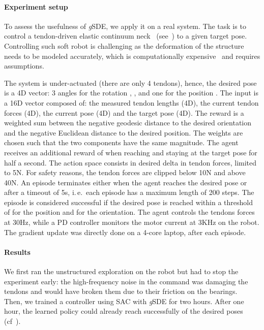 \documentclass{article}
\newcommand{\ie}{i.\,e.\ }
\newcommand{\ourSDE}{\textit{g}\textsc{SDE}\xspace}
\newcommand{\sac}{\textsc{SAC}\xspace}
\begin{document}
\paragraph{Experiment setup}

To assess the usefulness of \ourSDE, we apply it on a real system. The task is to control a tendon-driven elastic continuum neck~\citep{reinecke2016structurally} (see~) to a given target pose. Controlling such soft robot is challenging as the deformation of the structure needs to be modeled accurately, which is computationally expensive~\cite{deutschmann2017position, deutschmann2019six} and requires assumptions.

The system is under-actuated (there are only 4 tendons), hence, the desired pose is a 4D vector: 3 angles for the rotation , ,  and one for the position . The input is a 16D vector composed of: the measured tendon lengths (4D), the current tendon forces (4D), the current pose (4D) and the target pose (4D). The reward is a weighted sum between the negative geodesic distance to the desired orientation and the negative Euclidean distance to the desired position. The weights are chosen such that the two components have the same magnitude. The agent receives an additional reward of  when reaching and staying at the target pose for half a second.
The action space consists in desired delta in tendon forces, limited to 5N. For safety reasons, the tendon forces are clipped below 10N and above 40N.
An episode terminates either when the agent reaches the desired pose or after a timeout of 5s, \ie each episode has a maximum length of 200 steps. The episode is considered successful if the desired pose is reached within a threshold of  for the position and  for the orientation. The agent controls the tendons forces at 30Hz, while a PD controller monitors the motor current at 3KHz on the robot. The gradient update was directly done on a 4-core laptop, after each episode.

\paragraph{Results}

We first ran the unstructured exploration on the robot but had to stop the experiment early: the high-frequency noise in the command was damaging the tendons and would have broken them due to their friction on the bearings.\\
Then, we trained a controller using \sac with \ourSDE for two hours. After one hour, the learned policy could already reach successfully  of the desired poses (cf~).
\end{document}
